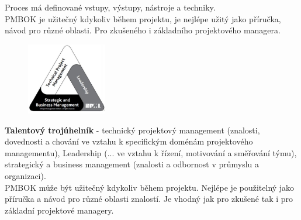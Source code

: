 \documentclass[11pt,a4paper]{article}
\begin{document}
        Proces má definované vstupy, výstupy, nástroje a techniky.\\
        PMBOK je užitečný kdykoliv během projektu, je nejlépe užitý jako příručka, návod pro různé oblasti. Pro zkušeného i základního projektového managera.
        \begin{figure}
        \centering
        \includegraphics[width=3.5cm]{talent_triangle.jpg}
        \label{fig:talenttriangle}
        \end{figure}
        \textbf{Talentový trojúhelník} - technický projektový management (znalosti, dovednosti a chování ve vztahu k specifickým doménám projektového managementu), Leadership (... ve vztahu k řízení, motivování a směřování týmu), strategický a business management (znalosti a odbornost v průmyslu a organizaci).\\
        PMBOK může být užitečný kdykoliv během projektu. Nejlépe je použitelný jako příručka a návod pro různé oblasti znalostí. Je vhodný jak pro zkušené tak i pro základní projektové managery.
\end{document}
